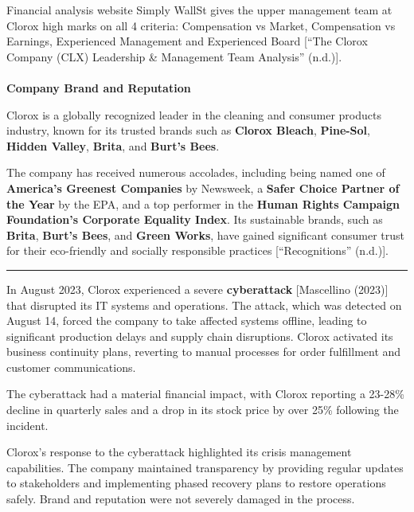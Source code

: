 \documentclass[
  letterpaper,
  DIV=11,
  numbers=noendperiod]{scrartcl}
\makeatletter
\let\oldparagraph\paragraph
\renewcommand{\paragraph}{
    \@ifstar
      \xxxParagraphStar
      \xxxParagraphNoStar
  }
\newcommand{\xxxParagraphStar}[1]{\oldparagraph*{#1}\mbox{}}
\newcommand{\xxxParagraphNoStar}[1]{\oldparagraph{#1}\mbox{}}
\makeatother
\begin{document}
Financial analysis website Simply WallSt gives the upper management team
at Clorox high marks on all 4 criteria: Compensation vs Market,
Compensation vs Earnings, Experienced Management and Experienced Board
{[}{``The {Clorox Company} ({CLX}) {Leadership} \& {Management Team
Analysis}''} (n.d.){]}.

\paragraph{\texorpdfstring{\textbf{Company Brand and
Reputation}}{Company Brand and Reputation}}\label{company-brand-and-reputation}

Clorox is a globally recognized leader in the cleaning and consumer
products industry, known for its trusted brands such as \textbf{Clorox
Bleach}, \textbf{Pine-Sol}, \textbf{Hidden Valley}, \textbf{Brita}, and
\textbf{Burt's Bees}.

The company has received numerous accolades, including being named one
of \textbf{America's Greenest Companies} by Newsweek, a \textbf{Safer
Choice Partner of the Year} by the EPA, and a top performer in the
\textbf{Human Rights Campaign Foundation's Corporate Equality Index}.
Its sustainable brands, such as \textbf{Brita}, \textbf{Burt's Bees},
and \textbf{Green Works}, have gained significant consumer trust for
their eco-friendly and socially responsible practices
{[}{``Recognitions''} (n.d.){]}.

\begin{center}\rule{0.5\linewidth}{0.5pt}\end{center}

In August 2023, Clorox experienced a severe \textbf{cyberattack}
{[}Mascellino (2023){]} that disrupted its IT systems and operations.
The attack, which was detected on August 14, forced the company to take
affected systems offline, leading to significant production delays and
supply chain disruptions. Clorox activated its business continuity
plans, reverting to manual processes for order fulfillment and customer
communications.

The cyberattack had a material financial impact, with Clorox reporting a
23-28\% decline in quarterly sales and a drop in its stock price by over
25\% following the incident.

Clorox's response to the cyberattack highlighted its crisis management
capabilities. The company maintained transparency by providing regular
updates to stakeholders and implementing phased recovery plans to
restore operations safely. Brand and reputation were not severely
damaged in the process.
\end{document}

